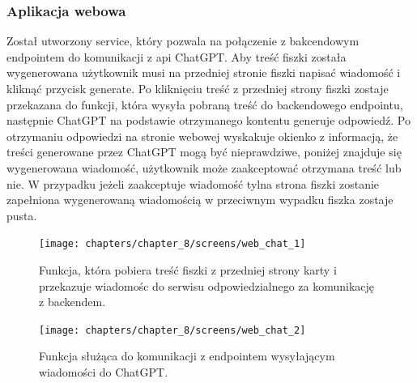 \subsubsection{Aplikacja webowa}
Został utworzony service, który pozwala na połączenie z bakcendowym endpointem do komunikacji z api ChatGPT. Aby treść fiszki została wygenerowana użytkownik musi na przedniej stronie fiszki napisać wiadomość i kliknąć przycisk generate. Po kliknięciu treść z przedniej strony fiszki zostaje przekazana do funkcji, która wysyła pobraną treść do backendowego endpointu, następnie ChatGPT na podstawie otrzymanego kontentu generuje odpowiedź. Po otrzymaniu odpowiedzi na stronie webowej wyskakuje okienko z informacją, że treści generowane przez ChatGPT mogą być nieprawdziwe, poniżej znajduje się wygenerowana wiadomość, użytkownik może zaakceptować otrzymana treść lub nie. W przypadku jeżeli zaakceptuje wiadomość tylna strona fiszki zostanie zapełniona wygenerowaną wiadomością w przeciwnym wypadku fiszka zostaje pusta.

\begin{figure}[H]
    \centering
    \texttt{[image: chapters/chapter\_8/screens/web\_chat\_1]}
    \caption{Funkcja, która pobiera treść fiszki z przedniej strony karty i przekazuje wiadomośc do serwisu odpowiedzialnego za komunikację z backendem.}
    \label{img:web_chat_1}
\end{figure}

\begin{figure}[H]
    \centering
    \texttt{[image: chapters/chapter\_8/screens/web\_chat\_2]}
    \caption{Funkcja służąca do komunikacji z endpointem wysyłającym wiadomości do ChatGPT.}
    \label{img:web_chat_2}
\end{figure}
